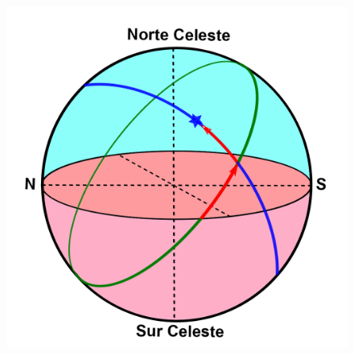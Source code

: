 \documentclass[10pt,a4paper]{article}
\begin{document}
\begin{figure}[H]
\centering
\includegraphics[scale=0.3]{Imagenes/C_Eclip_01}
\end{figure}
\end{document}
